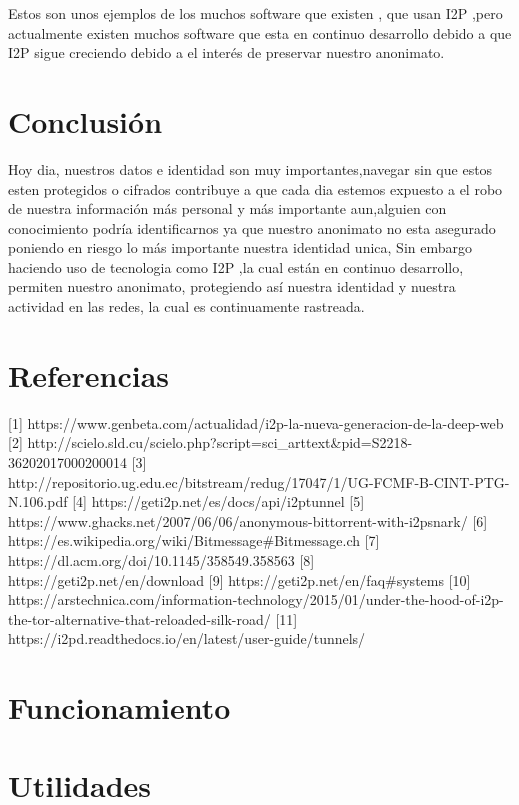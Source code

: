 \documentclass{article}
\begin{document}
Estos son unos  ejemplos de los muchos software que existen , que usan I2P ,pero actualmente existen muchos software que esta en continuo desarrollo debido a que 
I2P sigue creciendo debido a el interés de preservar nuestro anonimato.

\pagebreak

\section{Conclusión}
Hoy dia, nuestros datos e identidad son muy importantes,navegar sin que estos esten protegidos o cifrados contribuye a que cada dia estemos expuesto
a el robo de  nuestra información más personal y más importante aun,alguien con conocimiento podría identificarnos ya que nuestro anonimato no esta asegurado 
poniendo en riesgo lo más importante nuestra identidad unica, Sin embargo haciendo uso de tecnologia como I2P ,la cual  están en continuo desarrollo,
permiten nuestro anonimato, protegiendo así nuestra identidad y nuestra actividad en las redes, la cual es continuamente rastreada.

\pagebreak

\section{Referencias}

[1] https://www.genbeta.com/actualidad/i2p-la-nueva-generacion-de-la-deep-web
[2] http://scielo.sld.cu/scielo.php?script=sci\_arttext\&pid=S2218-36202017000200014
[3] http://repositorio.ug.edu.ec/bitstream/redug/17047/1/UG-FCMF-B-CINT-PTG-N.106.pdf
[4] https://geti2p.net/es/docs/api/i2ptunnel
[5] https://www.ghacks.net/2007/06/06/anonymous-bittorrent-with-i2psnark/
[6] https://es.wikipedia.org/wiki/Bitmessage\#Bitmessage.ch
[7] https://dl.acm.org/doi/10.1145/358549.358563
[8] https://geti2p.net/en/download
[9] https://geti2p.net/en/faq\#systems
[10] https://arstechnica.com/information-technology/2015/01/under-the-hood-of-i2p-the-tor-alternative-that-reloaded-silk-road/
[11] https://i2pd.readthedocs.io/en/latest/user-guide/tunnels/



\section{Funcionamiento}
\section{Utilidades}
\end{document}
